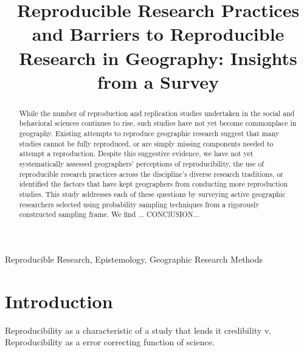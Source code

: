 \documentclass[]{interact}
\theoremstyle{plain}%
\theoremstyle{definition}
\theoremstyle{remark}
\begin{document}

\title{Reproducible Research Practices and Barriers to Reproducible Research in Geography: Insights from a Survey}

\author{
}

\maketitle

\begin{abstract}
While the number of reproduction and replication studies undertaken in the social and behavioral sciences continues to rise, such studies have not yet become commonplace in geography. 
Existing attempts to reproduce geographic research suggest that many studies cannot be fully reproduced, or are simply missing components needed to attempt a reproduction. 
Despite this suggestive evidence, we have not yet systematically assessed geographers' perceptions of reproducibility, the use of reproducible research practices across the discipline's diverse research traditions, or identified the factors that have kept geographers from conducting more reproduction studies.
This study addresses each of these questions by surveying active geographic researchers selected using probability sampling techniques from a rigorously constructed sampling frame.
We find ...
CONClUSION...

\end{abstract}

\begin{keywords}
Reproducible Research, Epistemology, Geographic Research Methods
\end{keywords}

\newpage
\section*{Introduction}
Reproducibility as a characteristic of a study that lends it credibility v. Reproducibility as a error correcting function of science. 
\end{document}
